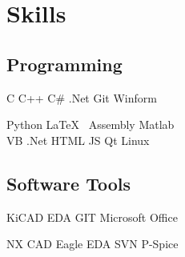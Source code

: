\documentclass[]{deedy-resume-openfont}
\begin{document}
\begin{minipage}[t]{0.33\textwidth}
\sectionsep


\section{Skills}
\subsection{Programming}
C \textbullet{}  C++ \textbullet{} C\# .Net \textbullet{}
Git \textbullet{} Winform

Python \textbullet{} \LaTeX\ \textbullet{} Assembly \textbullet{}
Matlab \\ VB .Net \textbullet{} HTML \textbullet{} JS \textbullet{} Qt \textbullet{} Linux
\subsection{Software Tools}
KiCAD EDA \textbullet{} GIT \textbullet{} Microsoft Office

NX CAD \textbullet{} Eagle EDA \textbullet{} SVN \textbullet{} P-Spice

\sectionsep

%
%

\end{minipage} 
\hfill
\end{document}

